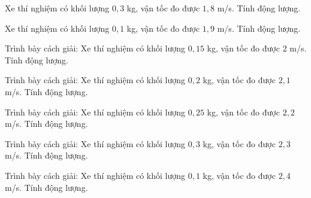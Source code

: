\begin{ex}
Xe thí nghiệm có khối lượng $0,3$ kg, vận tốc đo được $1,8$ m/s. Tính động lượng.
\end{ex}

\begin{ex}
Xe thí nghiệm có khối lượng $0,1$ kg, vận tốc đo được $1,9$ m/s. Tính động lượng.
\end{ex}

\begin{bt}
Trình bày cách giải: Xe thí nghiệm có khối lượng $0,15$ kg, vận tốc đo được $2$ m/s. Tính động lượng.
\end{bt}

\begin{bt}
Trình bày cách giải: Xe thí nghiệm có khối lượng $0,2$ kg, vận tốc đo được $2,1$ m/s. Tính động lượng.
\end{bt}

\begin{bt}
Trình bày cách giải: Xe thí nghiệm có khối lượng $0,25$ kg, vận tốc đo được $2,2$ m/s. Tính động lượng.
\end{bt}

\begin{bt}
Trình bày cách giải: Xe thí nghiệm có khối lượng $0,3$ kg, vận tốc đo được $2,3$ m/s. Tính động lượng.
\end{bt}

\begin{bt}
Trình bày cách giải: Xe thí nghiệm có khối lượng $0,1$ kg, vận tốc đo được $2,4$ m/s. Tính động lượng.
\end{bt}

